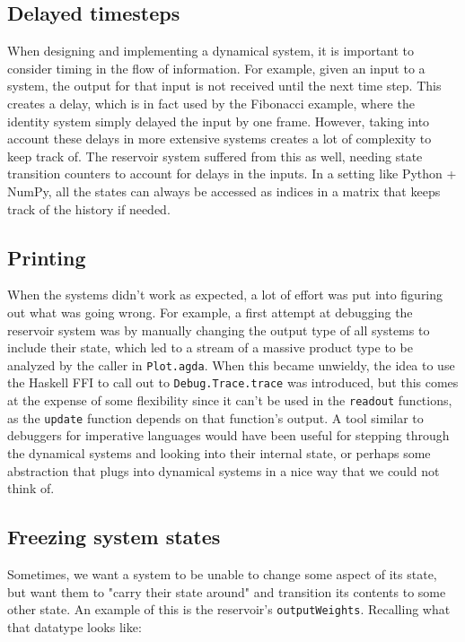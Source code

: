 \subsection{Delayed timesteps}
When designing and implementing a dynamical system, it is important to consider timing in the flow of information. For example, given an input to a system, the output for that input is not received until the next time step. This creates a delay, which is in fact used by the Fibonacci example, where the identity system simply delayed the input by one frame. However, taking into account these delays in more extensive systems creates a lot of complexity to keep track of. The reservoir system suffered from this as well, needing state transition counters to account for delays in the inputs. In a setting like Python + NumPy, all the states can always be accessed as indices in a matrix that keeps track of the history if needed.

\subsection{Printing}
When the systems didn't work as expected, a lot of effort was put into figuring out what was going wrong. For example, a first attempt at debugging the reservoir system was by manually changing the output type of all systems to include their state, which led to a stream of a massive product type to be analyzed by the caller in \texttt{Plot.agda}. When this became unwieldy, the idea to use the Haskell FFI to call out to \texttt{Debug.Trace.trace} was introduced, but this comes at the expense of some flexibility since it can't be used in the \texttt{readout} functions, as the \texttt{update} function depends on that function's output. A tool similar to debuggers for imperative languages would have been useful for stepping through the dynamical systems and looking into their internal state, or perhaps some abstraction that plugs into dynamical systems in a nice way that we could not think of.

\subsection{Freezing system states}
Sometimes, we want a system to be unable to change some aspect of its state, but want them to "carry their state around" and transition its contents to some other state. An example of this is the reservoir's \texttt{outputWeights}. Recalling what that datatype looks like:

